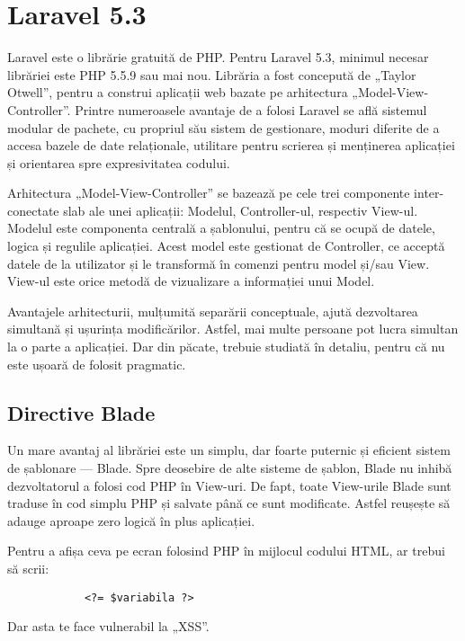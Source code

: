 \section{Laravel 5.3}


	Laravel este o librărie gratuită de PHP.
	Pentru Laravel 5.3, minimul necesar librăriei este PHP 5.5.9 sau mai nou.
	Librăria a fost concepută de „Taylor Otwell”, pentru a construi aplicații web bazate pe arhitectura „Model-View-Controller”.
	Printre numeroasele avantaje de a folosi Laravel se află sistemul modular de pachete, cu propriul său sistem de gestionare, moduri diferite de a accesa bazele de date relaționale, utilitare pentru scrierea și menținerea aplicației și orientarea spre expresivitatea codului.\cite{laravel_book}

	Arhitectura „Model-View-Controller” se bazează pe cele trei componente inter-conectate slab ale unei aplicații: Modelul, Controller-ul, respectiv View-ul.
	Modelul este componenta centrală a șablonului, pentru că se ocupă de datele, logica și regulile aplicației.
	Acest model este gestionat de Controller, ce acceptă datele de la utilizator și le transformă în comenzi pentru model și/sau View.
	View-ul este orice metodă de vizualizare a informației unui Model.\cite{poo_sa}

	Avantajele arhitecturii, mulțumită separării conceptuale, ajută dezvoltarea simultană și ușurința modificărilor.
	Astfel, mai multe persoane pot lucra simultan la o parte a aplicației.
	Dar din păcate, trebuie studiată în detaliu, pentru că nu este ușoară de folosit pragmatic.

	\subsection{Directive Blade}


		Un mare avantaj al librăriei este un simplu, dar foarte puternic și eficient sistem de șablonare --- Blade.
		Spre deosebire de alte sisteme de șablon, Blade nu inhibă dezvoltatorul a folosi cod PHP în View-uri.
		De fapt, toate View-urile Blade sunt traduse în cod simplu PHP și salvate până ce sunt modificate.
		Astfel reușește să adauge aproape zero logică în plus aplicației.

		Pentru a afișa ceva pe ecran folosind PHP în mijlocul codului HTML, ar trebui să scrii:
			\begin{Verbatim}
			<?= $variabila ?>
			\end{Verbatim}
		Dar asta te face vulnerabil la „XSS”.

